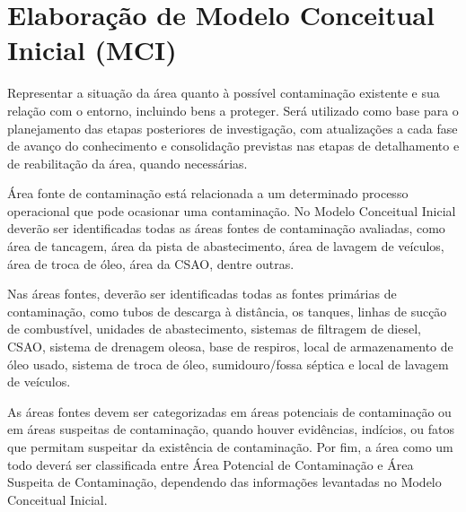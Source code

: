 \section{Elaboração de Modelo Conceitual Inicial (MCI)}

Representar a situação da área quanto à possível 
contaminação existente e sua relação com o entorno, 
incluindo bens a proteger. Será utilizado como base para o 
planejamento das etapas posteriores de investigação, com 
atualizações a cada fase de avanço do conhecimento e 
consolidação previstas nas etapas de detalhamento e de 
reabilitação da área, quando necessárias.

Área fonte de contaminação está relacionada a um 
determinado processo operacional que pode ocasionar uma 
contaminação. No Modelo Conceitual Inicial deverão ser 
identificadas todas as áreas fontes de contaminação 
avaliadas, como área de tancagem, área da pista de 
abastecimento, área de lavagem de veículos, área de troca 
de óleo, área da CSAO, dentre outras.

Nas áreas fontes, deverão ser identificadas todas as fontes 
primárias de contaminação, como tubos de descarga à 
distância, os tanques, linhas de sucção de combustível, 
unidades de abastecimento, sistemas de filtragem de diesel, 
CSAO, sistema de drenagem oleosa, base de respiros, local 
de armazenamento de óleo usado, sistema de troca de óleo, 
sumidouro/fossa séptica e local de lavagem de veículos.

As áreas fontes devem ser categorizadas em áreas potenciais 
de contaminação ou em áreas suspeitas de contaminação, 
quando houver evidências, indícios, ou fatos que permitam 
suspeitar da existência de contaminação. Por fim, a área 
como um todo deverá ser classificada entre Área Potencial 
de Contaminação e Área Suspeita de Contaminação, dependendo 
das informações levantadas no Modelo Conceitual Inicial.